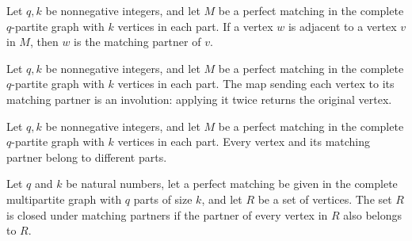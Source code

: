 \begin{theorem}
\label{FABL.graphPartiteMatchingPartner_unique}
\leanok
{}
Let $q,k$ be nonnegative integers, and let $M$ be a perfect matching in the complete
$q$-partite graph with $k$ vertices in each part. If a vertex $w$ is adjacent to a
vertex $v$ in $M$, then $w$ is the matching partner of $v$.
\end{theorem}

\begin{theorem}
\label{FABL.graphPartiteMatchingPartner_involutive}
\leanok
{}
Let $q,k$ be nonnegative integers, and let $M$ be a perfect matching in the complete
$q$-partite graph with $k$ vertices in each part. The map sending each vertex to its
matching partner is an involution: applying it twice returns the original vertex.
\end{theorem}

\begin{theorem}
\label{FABL.graphPartiteMatchingPartner_part_ne}
\leanok
{}
Let $q,k$ be nonnegative integers, and let $M$ be a perfect matching in the complete
$q$-partite graph with $k$ vertices in each part. Every vertex and its matching partner
belong to different parts.
\end{theorem}

\begin{definition}
\label{FABL.GraphMatchingClosedOn}
\leanok
{}
Let $q$ and $k$ be natural numbers, let a perfect matching be given in the complete
multipartite graph with $q$ parts of size $k$, and let $R$ be a set of vertices. The set
$R$ is closed under matching partners if the partner of every vertex in $R$ also belongs
to $R$.
\end{definition}

